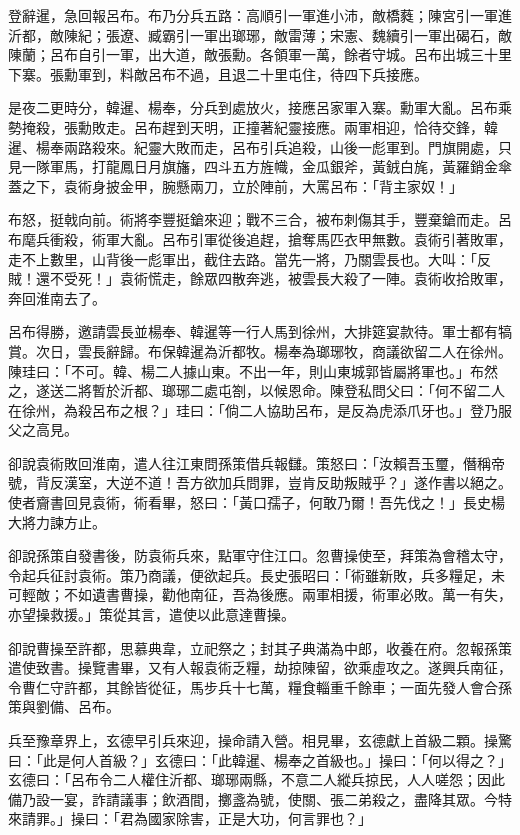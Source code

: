 登辭暹，急回報呂布。布乃分兵五路：高順引一軍進小沛，敵橋蕤；陳宮引一軍進沂都，敵陳紀；張遼、臧霸引一軍出瑯琊，敵雷薄；宋憲、魏續引一軍出碣石，敵陳蘭；呂布自引一軍，出大道，敵張勳。各領軍一萬，餘者守城。呂布出城三十里下寨。張勳軍到，料敵呂布不過，且退二十里屯住，待四下兵接應。

是夜二更時分，韓暹、楊奉，分兵到處放火，接應呂家軍入寨。勳軍大亂。呂布乘勢掩殺，張勳敗走。呂布趕到天明，正撞著紀靈接應。兩軍相迎，恰待交鋒，韓暹、楊奉兩路殺來。紀靈大敗而走，呂布引兵追殺，山後一彪軍到。門旗開處，只見一隊軍馬，打龍鳳日月旗旛，四斗五方旌幟，金瓜銀斧，黃銊白旄，黃羅銷金傘蓋之下，袁術身披金甲，腕懸兩刀，立於陣前，大罵呂布：「背主家奴！」

布怒，挺戟向前。術將李豐挺鎗來迎；戰不三合，被布刺傷其手，豐棄鎗而走。呂布麾兵衝殺，術軍大亂。呂布引軍從後追趕，搶奪馬匹衣甲無數。袁術引著敗軍，走不上數里，山背後一彪軍出，截住去路。當先一將，乃關雲長也。大叫：「反賊！還不受死！」袁術慌走，餘眾四散奔逃，被雲長大殺了一陣。袁術收拾敗軍，奔回淮南去了。

呂布得勝，邀請雲長並楊奉、韓暹等一行人馬到徐州，大排筵宴款待。軍士都有犒賞。次日，雲長辭歸。布保韓暹為沂都牧。楊奉為瑯琊牧，商議欲留二人在徐州。陳珪曰：「不可。韓、楊二人據山東。不出一年，則山東城郭皆屬將軍也。」布然之，遂送二將暫於沂都、瑯琊二處屯劄，以候恩命。陳登私問父曰：「何不留二人在徐州，為殺呂布之根？」珪曰：「倘二人協助呂布，是反為虎添爪牙也。」登乃服父之高見。

卻說袁術敗回淮南，遣人往江東問孫策借兵報讎。策怒曰：「汝賴吾玉璽，僭稱帝號，背反漢室，大逆不道！吾方欲加兵問罪，豈肯反助叛賊乎？」遂作書以絕之。使者齎書回見袁術，術看畢，怒曰：「黃口孺子，何敢乃爾！吾先伐之！」長史楊大將力諫方止。

卻說孫策自發書後，防袁術兵來，點軍守住江口。忽曹操使至，拜策為會稽太守，令起兵征討袁術。策乃商議，便欲起兵。長史張昭曰：「術雖新敗，兵多糧足，未可輕敵；不如遺書曹操，勸他南征，吾為後應。兩軍相援，術軍必敗。萬一有失，亦望操救援。」策從其言，遣使以此意達曹操。

卻說曹操至許都，思慕典韋，立祀祭之；封其子典滿為中郎，收養在府。忽報孫策遣使致書。操覽書畢，又有人報袁術乏糧，劫掠陳留，欲乘虛攻之。遂興兵南征，令曹仁守許都，其餘皆從征，馬步兵十七萬，糧食輜重千餘車；一面先發人會合孫策與劉備、呂布。

兵至豫章界上，玄德早引兵來迎，操命請入營。相見畢，玄德獻上首級二顆。操驚曰：「此是何人首級？」玄德曰：「此韓暹、楊奉之首級也。」操曰：「何以得之？」玄德曰：「呂布令二人權住沂都、瑯琊兩縣，不意二人縱兵掠民，人人嗟怨；因此備乃設一宴，詐請議事；飲酒間，擲盞為號，使關、張二弟殺之，盡降其眾。今特來請罪。」操曰：「君為國家除害，正是大功，何言罪也？」

